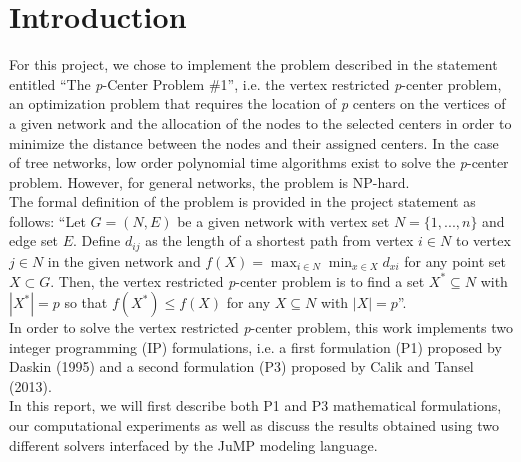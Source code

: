 \chapter{Introduction}
For this project, we chose to implement the problem described in the statement entitled ``The \textit{p}-Center Problem \#1'', i.e. the vertex restricted \textit{p}-center problem, an optimization problem that requires the location of \textit{p} centers on the vertices of a given network and the allocation of the nodes to the selected centers in order to minimize the distance between the nodes and their assigned centers. In the case of tree networks, low order polynomial time algorithms exist to solve the \textit{p}-center problem. However, for general networks, the problem is NP-hard.\\

The formal definition of the problem is provided in the project statement as follows: ``Let $G = \left( N, E\right)$ be a given network with vertex set $N = \lbrace 1, ..., n\rbrace$ and edge set $E$. Define $d_{ij}$ as the length of a shortest path from vertex $i \in N$ to vertex $j \in N$ in the given network and $f\left(X\right) = \max_{i \in N} \min_{x \in X} d_{xi}$ for any point set $X \subset G$. Then, the vertex restricted \textit{p}-center problem is to find a set $X^{*} \subseteq N$ with $|X^{*}| = p$ so that $f\left(X^{*}\right) \leq f\left(X\right)$ for any $X \subseteq N$ with $|X| = p$''.\\

In order to solve the vertex restricted \textit{p}-center problem, this work implements two integer programming (IP) formulations, i.e. a first formulation (P1) proposed by Daskin (1995) and a second formulation (P3) proposed by Calik and Tansel (2013).\\

In this report, we will first describe both P1 and P3 mathematical formulations, our computational experiments as well as discuss the results obtained using two different solvers interfaced by the JuMP modeling language.
